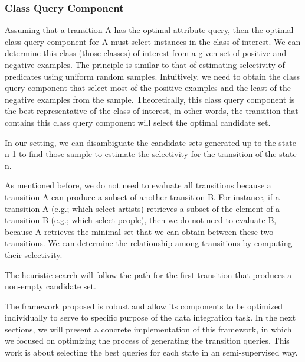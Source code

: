 \subsubsection{Class Query Component}

Assuming that a transition A has the optimal attribute query, then the optimal class query component for A must select instances in the class of interest. We can determine this class (those classes) of interest from a given set of positive and negative examples. The principle is similar to that of estimating selectivity of predicates using uniform random samples. Intuitively, we need to obtain the class query component that select most of the positive examples and the least of the negative examples from the sample. Theoretically, this class query component is the best representative of the class of interest, in other words, the transition that contains this class query component will select the optimal candidate set.

In our setting, we can disambiguate the candidate sets generated up to the state n-1 to find those sample to estimate the selectivity for the transition of the state n. 

As mentioned before, we do not need to evaluate all transitions because a transition A can produce a subset of another transition B. For instance, if a transition A (e.g.; which select artists) retrieves a subset of the element of a transition B (e.g.; which select people), then we do not need to evaluate B, because A retrieves the minimal set that we can obtain between these two transitions. We can determine the relationship among transitions by computing their selectivity.

\begin{definition} The heuristic search will follow the path for the first transition that produces a non-empty candidate set.
\end{definition}   

The framework proposed is robust and allow its components to be optimized individually to serve to specific purpose of the data integration task. In the next sections, we will present a concrete implementation of this framework, in which we focused on optimizing the process of generating the transition queries. This work is about selecting the best queries for each state in an semi-supervised way.

  